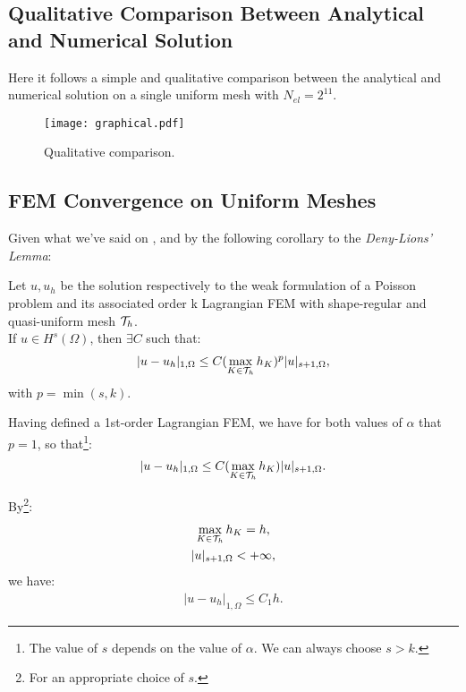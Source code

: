 \subsection{Qualitative Comparison Between Analytical and Numerical Solution}

Here it follows a simple and qualitative comparison between the analytical and numerical solution on a single uniform mesh with $N_{el} = 2^{11}$.

\begin{figure}[!ht]
	\centering
	\texttt{[image: graphical.pdf]}
	\caption{Qualitative comparison.}
\end{figure}

\subsection{FEM Convergence on Uniform Meshes}

Given what we've said on , and by the following corollary to the \textit{Deny-Lions' Lemma}:

\begin{theorem*}
	Let $u, u_h$ be the solution respectively to the weak formulation of a Poisson problem and its associated order k Lagrangian FEM with shape-regular and quasi-uniform mesh $\mathcal{T}_h$. \\ 
	If $u \in H^s(\Omega)$, then $\exists C$ such that:
	\begin{gather}
		|u - u_h|_{1, \Omega} \le C (\max_{K \in \mathcal{T}_h} h_K)^{p}|u|_{s+1, \Omega},
	\end{gather}
	with $p = \min(s, k)$.
\end{theorem*}

Having defined a 1st-order Lagrangian FEM, we have for both values of $\alpha$ that $p = 1$, so that\footnote{The value of $s$ depends on the value of $\alpha$. We can always choose $s > k$.}:
\begin{gather}
	|u - u_h|_{1, \Omega} \le C (\max_{K \in \mathcal{T}_h} h_K)|u|_{s+1, \Omega}.
\end{gather}

By\footnote{For an appropriate choice of $s$.}:
\begin{gather}
	\max_{K \in \mathcal{T}_h} h_K = h, \\
	|u|_{s+1, \Omega} < +\infty,
\end{gather}
we have:
\begin{gather}
	|u - u_h|_{1, \Omega} \le C_1 h.
\end{gather}

